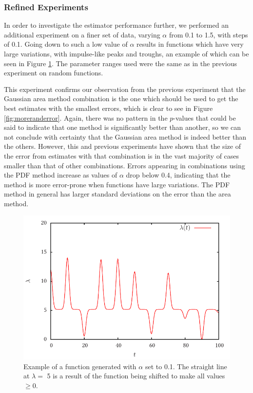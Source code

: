 \documentclass[a4paper,11pt]{article}
\begin{document}
\subsubsection{Refined Experiments}
\label{sec-8-2-2}

    In order to investigate the estimator performance further, we performed an
    additional experiment on a finer set of data, varying $\alpha$ from 0.1 to 1.5,
    with steps of 0.1. Going down to such a low value of $\alpha$ results in
    functions which have very large variations, with impulse-like peaks and troughs,
    an example of which can be seen in Figure \ref{fig:smallalpha}. The parameter
    ranges used were the same as in the previous experiment on random functions.

    This experiment confirms our observation from the previous experiment that the
    Gaussian area method combination is the one which should be used to get the best
    estimates with the smallest errors, which is clear to see in Figure
    \ref{fig:moreranderror}. Again, there was no pattern in the $p$-values that
    could be said to indicate that one method is significantly better than another,
    so we can not conclude with certainty that the Gaussian area method is indeed
    better than the others. However, this and previous experiments have shown that
    the size of the error from estimates with that combination is in the vast
    majority of cases smaller than that of other combinations. Errors appearing in
    combinations using the PDF method increase as values of $\alpha$ drop below 0.4,
    indicating that the method is more error-prone when functions have large
    variations. The PDF method in general has larger standard deviations on the
    error than the area method.
    \begin{figure}
    \includegraphics{smallalpha}
    \caption{Example of a function generated with $\alpha$ set to 0.1. The straight
    line at $\lambda=$ 5 is a result of the function being shifted to make all values
    $\geq 0$.}
    \label{fig:smallalpha}
    \end{figure}
\end{document}
